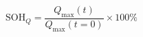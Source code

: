 \documentclass[preview]{standalone}
\begin{document}
\[\text{SOH}_Q = \frac{Q_\text{max}(t)}{Q_\text{max}(t=0)} \times 100\% \tag{3.8}\]
\end{document}
